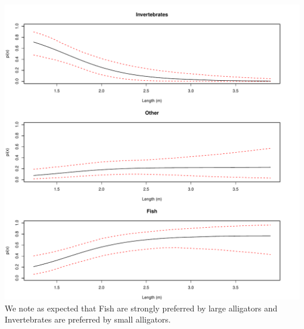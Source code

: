 \documentclass[12pt]{article}
\begin{document}
\begin{enumerate}
\begin{enumerate}[(a)]
	\includegraphics[scale = .7]{plot2.pdf} \\
	We note as expected that Fish are strongly preferred by large alligators and Invertebrates are preferred by small alligators. 
	

\end{enumerate}
\end{enumerate}
\end{document}
